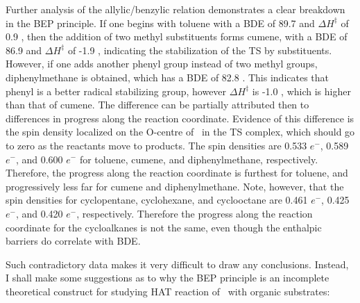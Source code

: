 Further analysis of the allylic/benzylic relation demonstrates a clear breakdown in the BEP principle. If one begins with toluene with a BDE of 89.7 \kcalmol and $\Delta H^\ddagger$ of 0.9 \kcalmol, then the addition of two methyl substituents forms cumene, with a BDE of 86.9 \kcalmol and $\Delta H^\ddagger$ of -1.9 \kcalmol, indicating the stabilization of the TS by substituents. However, if one adds another phenyl group instead of two methyl groups, diphenylmethane is obtained, which has a BDE of 82.8 \kcalmol. This indicates that phenyl is a better radical stabilizing group, however $\Delta H^\ddagger$ is -1.0 \kcalmol, which is higher than that of cumene. The difference can be partially attributed then to differences in progress along the reaction coordinate. Evidence of this difference is the spin density localized on the O-centre of \cumo\ in the TS complex, which should go to zero as the reactants move to products. The  spin densities are 0.533 $e^-$, 0.589 $e^-$, and 0.600 $e^-$ for toluene, cumene, and diphenylmethane, respectively. Therefore, the progress along the reaction coordinate is furthest for toluene, and progressively less far for cumene and diphenylmethane. Note, however, that the  spin densities for cyclopentane, cyclohexane, and cyclooctane are 0.461 $e^-$, 0.425 $e^-$, and 0.420 $e^-$, respectively. Therefore the progress along the reaction coordinate for the cycloalkanes is not the same, even though the enthalpic barriers do correlate with BDE.

Such contradictory data makes it very difficult to draw any conclusions. Instead, I shall make some suggestions as to why the BEP principle is an incomplete theoretical construct for studying HAT reaction of \cumo\ with organic substrates:


